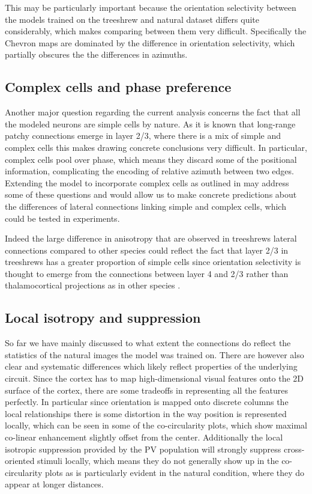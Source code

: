 This may be particularly important because the orientation selectivity
between the models trained on the treeshrew and natural dataset
differs quite considerably, which makes comparing between them very
difficult. Specifically the Chevron maps are dominated by the
difference in orientation selectivity, which partially obscures the
the differences in azimuths.

\subsection{Complex cells and phase preference}

Another major question regarding the current analysis concerns the
fact that all the modeled neurons are simple cells by nature. As it is
known that long-range patchy connections emerge in layer 2/3, where
there is a mix of simple and complex cells this makes drawing concrete
conclusions very difficult. In particular, complex cells pool over
phase, which means they discard some of the positional information,
complicating the encoding of relative azimuth between two
edges. Extending the model to incorporate complex cells as outlined in
\cite{Antolik2010} may address some of these questions and would allow
us to make concrete predictions about the differences of lateral
connections linking simple and complex cells, which could be tested in
experiments.

Indeed the large difference in anisotropy that are observed in
treeshrews lateral connections compared to other species could reflect
the fact that layer 2/3 in treeshrews has a greater proportion of
simple cells since orientation selectivity is thought to emerge from
the connections between layer 4 and 2/3 rather than thalamocortical
projections as in other species \citep{VanHooser2013}.

\subsection{Local isotropy and suppression}

So far we have mainly discussed to what extent the connections do
reflect the statistics of the natural images the model was trained
on. There are however also clear and systematic differences which
likely reflect properties of the underlying circuit. Since the cortex
has to map high-dimensional visual features onto the 2D surface of the
cortex, there are some tradeoffs in representing all the features
perfectly. In particular since orientation is mapped onto discrete
columns the local relationships there is some distortion in the way
position is represented locally, which can be seen in some of the
co-circularity plots, which show maximal co-linear enhancement
slightly offset from the center. Additionally the local isotropic
suppression provided by the PV population will strongly suppress
cross-oriented stimuli locally, which means they do not generally show
up in the co-circularity plots as is particularly evident in the
natural condition, where they do appear at longer distances.

